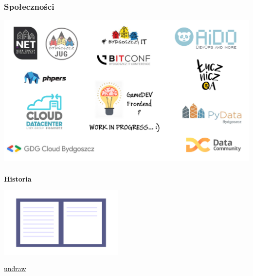 \documentclass{beamer}
\newcommand{\source}[2]{
	\begin{flushright}
		\hfill {\scriptsize \href{#1}{#2}}	
	\end{flushright}
}
\begin{document}

\begin{frame}
\frametitle{\textbf{Społeczności}}

    \includegraphics[width=\textwidth]{community.png}

\end{frame}

\begin{frame}
\frametitle{\textbf{}}

\begin{minipage}{0.45\textwidth}
\begin{center}
    {\fontsize{30}{40}\selectfont \textbf{Historia}}
\end{center}
\end{minipage}
\begin{minipage}{0.45\textwidth}
    \hspace{15mm}
    \vskip 5mm
    \includegraphics[height=35mm]{notebook.png}
    \source{https://undraw.co/illustrations}{undraw}
\end{minipage}

\end{frame}

\end{document}
